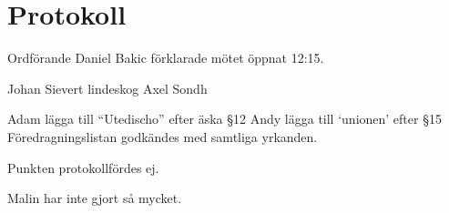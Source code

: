 \documentclass[10pt]{article}
\def\mo{Daniel Bakic}
\begin{document}
    \begin{comment}
    \subsection*{Adjungerande}
    \begin{narvarolista}
    \end{narvarolista}
    \end{comment}
    
    \section*{Protokoll}
    \begin{paragrafer}
        Ordförande {\mo} förklarade mötet öppnat 12:15.
        
        {\valavmo}
        
        {\valavms}
        
        {\valavj}
        
        {\tosg}
        
        {\ingaadj}
        Johan Sievert lindeskog
        Axel Sondh
        
        
        Adam \ypa lägga till ``Utedischo'' efter äska \S12
        Andy \ypa lägga till `unionen' efter \S15
        Föredragningslistan godkändes med samtliga yrkanden.
        
        \ingaprot
        
        \begin{fyllnadsval} %
        \end{fyllnadsval}
        
        \begin{paragrafer}
            Punkten protokollfördes ej.
            
            Malin har inte gjort så mycket.
            

\end{paragrafer}
\end{paragrafer}
\end{document}
